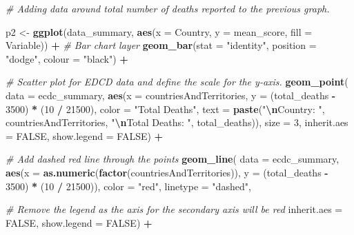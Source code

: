 \documentclass[
]{article}
\newenvironment{Shaded}{\begin{snugshade}}{\end{snugshade}}
\newcommand{\AttributeTok}[1]{\textcolor[rgb]{0.13,0.29,0.53}{#1}}
\newcommand{\CommentTok}[1]{\textcolor[rgb]{0.56,0.35,0.01}{\textit{#1}}}
\newcommand{\ConstantTok}[1]{\textcolor[rgb]{0.56,0.35,0.01}{#1}}
\newcommand{\DecValTok}[1]{\textcolor[rgb]{0.00,0.00,0.81}{#1}}
\newcommand{\FunctionTok}[1]{\textcolor[rgb]{0.13,0.29,0.53}{\textbf{#1}}}
\newcommand{\NormalTok}[1]{#1}
\newcommand{\OtherTok}[1]{\textcolor[rgb]{0.56,0.35,0.01}{#1}}
\newcommand{\SpecialCharTok}[1]{\textcolor[rgb]{0.81,0.36,0.00}{\textbf{#1}}}
\newcommand{\StringTok}[1]{\textcolor[rgb]{0.31,0.60,0.02}{#1}}
\begin{document}
\begin{Shaded}
\begin{Highlighting}[]
\CommentTok{\# Adding data around total number of deaths reported to the previous graph. }

\NormalTok{p2 }\OtherTok{\textless{}{-}} \FunctionTok{ggplot}\NormalTok{(data\_summary, }\FunctionTok{aes}\NormalTok{(}\AttributeTok{x =}\NormalTok{ Country, }\AttributeTok{y =}\NormalTok{ mean\_score, }\AttributeTok{fill =}\NormalTok{ Variable)) }\SpecialCharTok{+}
  \CommentTok{\# Bar chart layer}
  \FunctionTok{geom\_bar}\NormalTok{(}\AttributeTok{stat =} \StringTok{"identity"}\NormalTok{, }\AttributeTok{position =} \StringTok{"dodge"}\NormalTok{, }\AttributeTok{colour =} \StringTok{"black"}\NormalTok{) }\SpecialCharTok{+}
  
  \CommentTok{\# Scatter plot for EDCD data and define the scale for the y{-}axis. }
  \FunctionTok{geom\_point}\NormalTok{(}
    \AttributeTok{data =}\NormalTok{ ecdc\_summary,  }
    \FunctionTok{aes}\NormalTok{(}\AttributeTok{x =}\NormalTok{ countriesAndTerritories, }\AttributeTok{y =}\NormalTok{ (total\_deaths }\SpecialCharTok{{-}} \DecValTok{3500}\NormalTok{) }\SpecialCharTok{*}\NormalTok{ (}\DecValTok{10} \SpecialCharTok{/} \DecValTok{21500}\NormalTok{), }\AttributeTok{color =} \StringTok{"Total Deaths"}\NormalTok{, }\AttributeTok{text =} \FunctionTok{paste}\NormalTok{(}\StringTok{"}\SpecialCharTok{\textbackslash{}n}\StringTok{Country: "}\NormalTok{, countriesAndTerritories, }\StringTok{"}\SpecialCharTok{\textbackslash{}n}\StringTok{Total Deaths: "}\NormalTok{, total\_deaths)),  }
    \AttributeTok{size =} \DecValTok{3}\NormalTok{,}
    \AttributeTok{inherit.aes =} \ConstantTok{FALSE}\NormalTok{,}
    \AttributeTok{show.legend =} \ConstantTok{FALSE}\NormalTok{) }\SpecialCharTok{+}
  
  \CommentTok{\# Add dashed red line through the points}
  \FunctionTok{geom\_line}\NormalTok{(}
    \AttributeTok{data =}\NormalTok{ ecdc\_summary,}
    \FunctionTok{aes}\NormalTok{(}\AttributeTok{x =} \FunctionTok{as.numeric}\NormalTok{(}\FunctionTok{factor}\NormalTok{(countriesAndTerritories)), }\AttributeTok{y =}\NormalTok{ (total\_deaths }\SpecialCharTok{{-}} \DecValTok{3500}\NormalTok{) }\SpecialCharTok{*}\NormalTok{ (}\DecValTok{10} \SpecialCharTok{/} \DecValTok{21500}\NormalTok{)),}
    \AttributeTok{color =} \StringTok{"red"}\NormalTok{,}
    \AttributeTok{linetype =} \StringTok{"dashed"}\NormalTok{,}
    
    \CommentTok{\# Remove the legend as the axis for the secondary axis will be red}
    \AttributeTok{inherit.aes =} \ConstantTok{FALSE}\NormalTok{,}
    \AttributeTok{show.legend =} \ConstantTok{FALSE}\NormalTok{) }\SpecialCharTok{+}
  

\end{Highlighting}
\end{Shaded}
\end{document}
